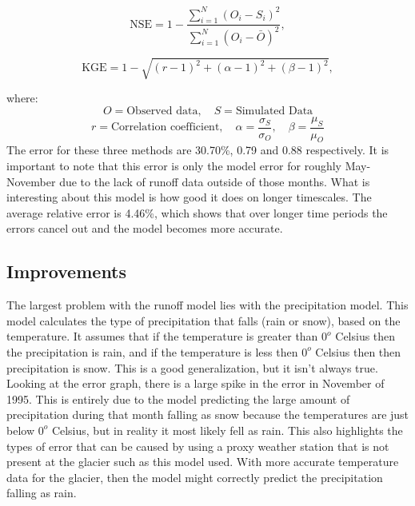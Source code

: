 \documentclass{article}
\begin{document}
\begin{equation}
    \mathrm{NSE} = 1 - \frac{\sum_{i=1}^{N}\left( O_i - S_i \right)^2}{\sum_{i=1}^{N}\left( O_i - \bar{O} \right)^2},
\end{equation}

\begin{equation}
    \mathrm{KGE} = 1 - \sqrt{ (r-1)^2 + (\alpha-1)^2 + (\beta-1)^2 },
\end{equation}
    
\noindent where:
$$O = \text{Observed data}, \quad S=\text{Simulated Data}$$
$$r = \mbox{Correlation coefficient}, \quad \alpha = \frac{\sigma_S}{\sigma_O}, \quad \beta = \frac{\mu_S}{\mu_O}$$
The error for these three methods are 30.70\%, 0.79 and 0.88 respectively. It is important to note that this error is only the model error for 
roughly May-November due to the lack of runoff data outside of those months. What is interesting about this model is how good it does on longer 
timescales. The average relative error is 4.46\%, which shows that over longer time periods the errors cancel out and the model becomes more 
accurate.
\subsection{Improvements}
The largest problem with the runoff model lies with the precipitation model. This model calculates the type of precipitation that falls (rain or 
snow), based on the temperature. It assumes that if the temperature is greater than $0^{o}$ Celsius then the precipitation is rain, and if the 
temperature is less then $0^{o}$ Celsius then then precipitation is snow. This is a good generalization, but it isn't always true. Looking at the 
error graph, there is a large spike in the error in November of 1995. This is entirely due to the model predicting the large amount of precipitation during that 
month falling as snow because the temperatures are just below $0^o$ Celsius, but in reality it most likely fell as rain. This also highlights the 
types of error that can be caused by using a proxy weather station that is not present at the glacier such as this model used. With more accurate 
temperature data for the glacier, then the model might correctly predict the precipitation falling as rain.
\end{document}
